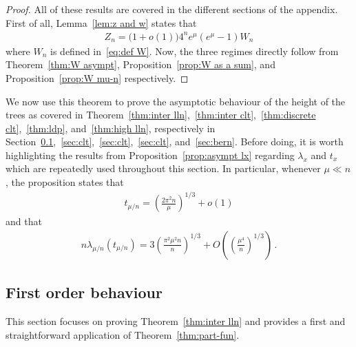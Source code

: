 \documentclass{article}
\newcommand{\1}{\mathbbm{1}}								%
\theoremstyle{definition}
\numberwithin{equation}{section}
\begin{document}
\begin{proof}
    All of these results are covered in the different sections of the appendix.
    First of all, Lemma~\ref{lem:z and w} states that
    \begin{align*}
        Z_n=\big(1+o(1)\big)4^ne^\mu(e^\mu-1)W_n
    \end{align*}
    where $W_n$ is defined in~\eqref{eq:def W}.
    Now, the three regimes directly follow from Theorem~\ref{thm:W asympt}, Proposition~\ref{prop:W as a sum}, and Proposition~\ref{prop:W mu-n} respectively.
\end{proof}

We now use this theorem to prove the asymptotic behaviour of the height of the trees as covered in Theorem~\ref{thm:inter lln},~\ref{thm:inter clt},~\ref{thm:discrete clt},~\ref{thm:ldp}, and~\ref{thm:high lln}, respectively in Section~\ref{sec:lln},~\ref{sec:clt},~\ref{sec:clt},~\ref{sec:clt}, and~\ref{sec:bern}.
Before doing, it is worth highlighting the results from Proposition~\ref{prop:asympt lx} regarding $\lambda_x$ and $t_x$ which are repeatedly used throughout this section.
In particular, whenever $\mu\ll n$, the proposition states that
\begin{align*}
    t_{\mu/n}=\left(\frac{2\pi^2n}{\mu}\right)^{1/3}+o(1)
\end{align*}
and that
\begin{align*}
    n\lambda_{\mu/n}(t_{\mu/n})=3\left(\frac{\pi^2\mu^2n}{n}\right)^{1/3}+O\left(\left(\frac{\mu^4}{n}\right)^{1/3}\right)\,.
\end{align*}

\subsection{First order behaviour}\label{sec:lln}

This section focuses on proving Theorem~\ref{thm:inter lln} and provides a first and straightforward application of Theorem~\ref{thm:part-fun}.
\end{document}
